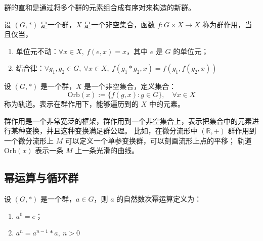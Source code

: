 
\begin{note}
    群的直和是通过将多个群的元素组合成有序对来构造的新群。
\end{note}

\vspace{1em}

\begin{definition}
    设 $(G, *)$ 是一个群，$X$ 是一个非空集合，函数 $f:G\times X\to X$ 称为群作用，当且仅当，
    \begin{enumerate}
        \item 单位元不动：$\forall x\in X,\ f(e,x) = x$，其中 $e$ 是 $G$ 的单位元；
        \item 结合律：$\forall g_1, g_2\in G,\ \forall x\in X,\ f(g_1 * g_2, x) = f(g_1, f(g_2, x))$
    \end{enumerate}
    \label{def:group_action}
\end{definition}

\begin{definition}[轨道 Orbit]
    设 $(G, *)$ 是一个群，$X$ 是一个非空集合，定义集合：
    \[
        \mathrm{Orb}(x) := \{f(g,x):g\in G\},\quad \forall x\in X
    \]
    称为轨道。表示在群作用下，能够遍历到的 $X$ 中的元素。
\end{definition}

\begin{note}
    群作用是一个非常宽泛的框架，群作用到一个非空集合上，表示把集合中的元素进行某种变换，并且这种变换满足群公理。
    比如，在微分流形中 $(\mathbb{R},+)$ 群作用到一个微分流形上 $M$ 可以定义一个单参变换群，可以刻画流形上点的平移；
    轨道 $\mathrm{Orb}(x)$ 表示一条 $M$ 上一条光滑的曲线。
\end{note}

\vspace{1em}
\subsection{幂运算与循环群}
\begin{definition}[群元素的自然数次幂运算]
    设 $(G, *)$ 是一个群，$a\in G$，则 $a$ 的自然数次幂运算定义为：
    \begin{enumerate}
        \item $a^0 = e$；
        \item $a^n = a^{n-1} * a,\ n > 0$
    \end{enumerate}
\end{definition}

